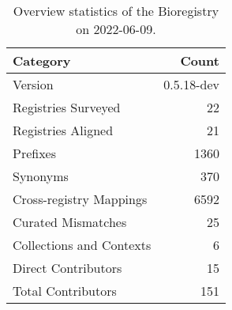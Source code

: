 \begin{table}
\centering
\caption{Overview statistics of the Bioregistry on 2022-06-09.}
\label{tab:bioregistry-summary}
\begin{tabular}{lr}
\toprule
                Category &      Count \\
\midrule
                 Version & 0.5.18-dev \\
     Registries Surveyed &         22 \\
      Registries Aligned &         21 \\
                Prefixes &       1360 \\
                Synonyms &        370 \\
 Cross-registry Mappings &       6592 \\
      Curated Mismatches &         25 \\
Collections and Contexts &          6 \\
     Direct Contributors &         15 \\
      Total Contributors &        151 \\
\bottomrule
\end{tabular}
\end{table}

